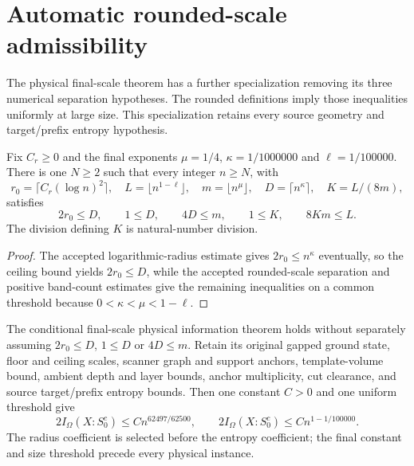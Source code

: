 \section{Automatic rounded-scale admissibility}
\label{sec:source-rounded-information}

The physical final-scale theorem has a further specialization removing its
three numerical separation hypotheses.  The rounded definitions
imply those inequalities uniformly at large size.  This specialization
retains every source geometry and target/prefix entropy hypothesis.

\begin{lemma}
    \label{thm:final-scanner-admissibility}
    \leanok
    Fix $C_r\geq0$ and the final exponents
    $\mu=1/4$, $\kappa=1/1000000$ and $\ell=1/100000$.
    There is one $N\geq2$ such that every integer $n\geq N$, with
    \[
        r_0=\lceil C_r(\log n)^2\rceil,\quad
        L=\lfloor n^{1-\ell}\rfloor,\quad
        m=\lfloor n^\mu\rfloor,\quad D=\lceil n^\kappa\rceil,\quad
        K=L/(8m),
    \]
    satisfies
    \[
        2r_0\leq D,\qquad 1\leq D,\qquad 4D\leq m,\qquad
        1\leq K,\qquad 8Km\leq L.
    \]
    The division defining $K$ is natural-number division.
\end{lemma}

\begin{proof}
    \leanok
    The accepted logarithmic-radius estimate gives
    $2r_0\leq n^\kappa$ eventually, so the ceiling bound yields
    $2r_0\leq D$, while the accepted rounded-scale separation and positive
    band-count estimates give the remaining inequalities on a common threshold because
    $0<\kappa<\mu<1-\ell$.
\end{proof}

\begin{lemma}
    \label{thm:source-rounded-information}
    \leanok
    The conditional final-scale physical information theorem holds without
    separately assuming $2r_0\leq D$, $1\leq D$ or $4D\leq m$.
    Retain its original gapped ground state, floor and ceiling
    scales, scanner graph and support anchors, template-volume bound,
    ambient depth and layer bounds, anchor multiplicity, cut clearance,
    and source target/prefix entropy bounds.  Then one constant $C>0$ and
    one uniform threshold give
    \[
        2I_\Omega(X:S_0^c)\leq Cn^{62497/62500},\qquad
        2I_\Omega(X:S_0^c)\leq Cn^{1-1/100000}.
    \]
    The radius coefficient is selected before the entropy coefficient;
    the final constant and size threshold precede every physical instance.
\end{lemma}

